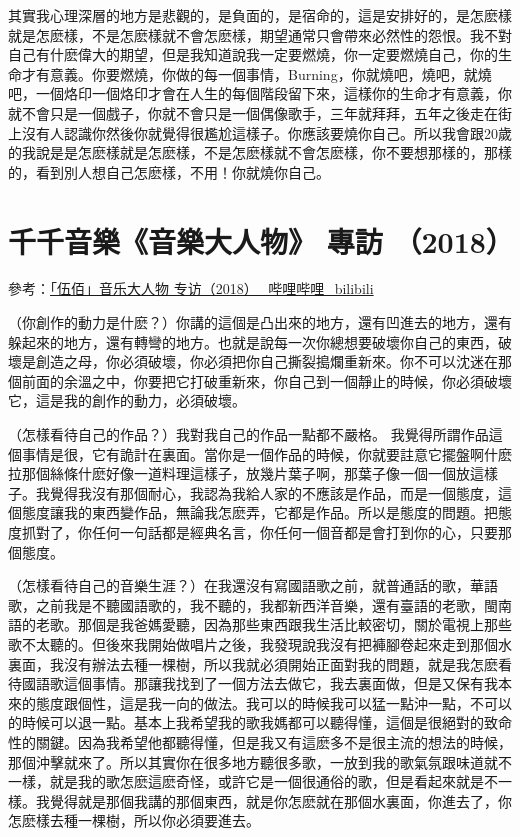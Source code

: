 \documentclass[UTF8,a4paper,oneside,twocolumn,12pt]{ctexbook}
\begin{document}
其實我心理深層的地方是悲觀的，是負面的，是宿命的，這是安排好的，是怎麽樣就是怎麽樣，不是怎麽樣就不會怎麽樣，期望通常只會帶來必然性的怨恨。我不對自己有什麽偉大的期望，但是我知道說我一定要燃燒，你一定要燃燒自己，你的生命才有意義。你要燃燒，你做的每一個事情，Burning，你就燒吧，燒吧，就燒吧，一個烙印一個烙印才會在人生的每個階段留下來，這樣你的生命才有意義，你就不會只是一個戲子，你就不會只是一個偶像歌手，三年就拜拜，五年之後走在街上沒有人認識你然後你就覺得很尷尬這樣子。你應該要燒你自己。所以我會跟20歲的我說是是怎麽樣就是怎麽樣，不是怎麽樣就不會怎麽樣，你不要想那樣的，那樣的，看到別人想自己怎麽樣，不用！你就燒你自己。

\section{千千音樂《音樂大人物》 專訪 （2018）}
參考：\href{https://www.bilibili.com/video/BV1o7411H7eK?vd_source=b28d2965994146c1572f764754540d4a}{「伍佰」音乐大人物 专访（2018）\_哔哩哔哩\_bilibili}

（你創作的動力是什麽？）你講的這個是凸出來的地方，還有凹進去的地方，還有躲起來的地方，還有轉彎的地方。也就是說每一次你總想要破壞你自己的東西，破壞是創造之母，你必須破壞，你必須把你自己撕裂搗爛重新來。你不可以沈迷在那個前面的余溫之中，你要把它打破重新來，你自己到一個靜止的時候，你必須破壞它，這是我的創作的動力，必須破壞。

（怎樣看待自己的作品？）我對我自己的作品一點都不嚴格。
我覺得所謂作品這個事情是很，它有詭計在裏面。當你是一個作品的時候，你就要註意它擺盤啊什麽拉那個絲條什麽好像一道料理這樣子，放幾片葉子啊，那葉子像一個一個放這樣子。我覺得我沒有那個耐心，我認為我給人家的不應該是作品，而是一個態度，這個態度讓我的東西變作品，無論我怎麽弄，它都是作品。所以是態度的問題。把態度抓對了，你任何一句話都是經典名言，你任何一個音都是會打到你的心，只要那個態度。

（怎樣看待自己的音樂生涯？）在我還沒有寫國語歌之前，就普通話的歌，華語歌，之前我是不聽國語歌的，我不聽的，我都新西洋音樂，還有臺語的老歌，閩南語的老歌。那個是我爸媽愛聽，因為那些東西跟我生活比較密切，關於電視上那些歌不太聽的。但後來我開始做唱片之後，我發現說我沒有把褲腳卷起來走到那個水裏面，我沒有辦法去種一棵樹，所以我就必須開始正面對我的問題，就是我怎麽看待國語歌這個事情。那讓我找到了一個方法去做它，我去裏面做，但是又保有我本來的態度跟個性，這是我一向的做法。我可以的時候我可以猛一點沖一點，不可以的時候可以退一點。基本上我希望我的歌我媽都可以聽得懂，這個是很絕對的致命性的關鍵。因為我希望他都聽得懂，但是我又有這麽多不是很主流的想法的時候，那個沖擊就來了。所以其實你在很多地方聽很多歌，一放到我的歌氣氛跟味道就不一樣，就是我的歌怎麽這麽奇怪，或許它是一個很通俗的歌，但是看起來就是不一樣。我覺得就是那個我講的那個東西，就是你怎麽就在那個水裏面，你進去了，你怎麽樣去種一棵樹，所以你必須要進去。
\end{document}
